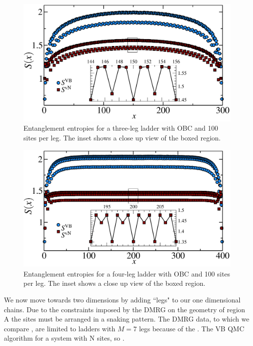 \begin{figure} { \includegraphics[width=6in]{./figures/paper1/figure3/3-leg-ladder/fig3_final2.pdf}
\caption[Entanglement entropies for a three-leg ladder]{
Entanglement entropies for a three-leg ladder with OBC and 100 sites per leg.  
The inset shows a close up view of the boxed region.
 \label{ladder3} }} 
 \end{figure}
 
 \begin{figure} { \includegraphics[width=6in]{./figures/paper1/figure3/4-leg-ladder/4legfig.pdf}
\caption[Entanglement entropies for a four-leg ladder]{
Entanglement entropies for a four-leg ladder with OBC and 100 sites per leg.  
The inset shows a close up view of the boxed region.  
 \label{ladder4} }} 
 \end{figure}
 
 We now move towards two dimensions by adding ``legs" to our one dimensional chains.
 Due to the constraints imposed by the DMRG on the geometry of region A the sites must be arranged in a snaking pattern. 
The DMRG data, to which we compare \vb, are limited to ladders with $M=7$ legs because of the .
 The VB QMC algorithm  for a system with N sites, so .
 
